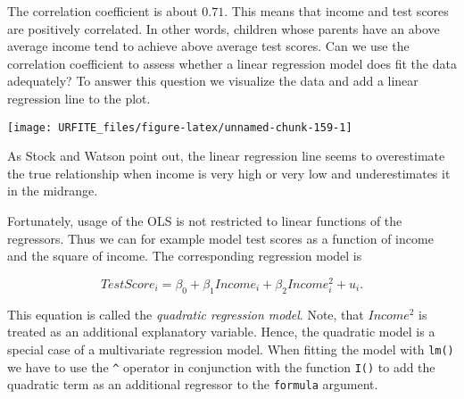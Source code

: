\documentclass[]{book}
\newenvironment{Shaded}{\begin{snugshade}}{\end{snugshade}}
\newcommand{\KeywordTok}[1]{\textcolor[rgb]{0.13,0.29,0.53}{\textbf{#1}}}
\newcommand{\DataTypeTok}[1]{\textcolor[rgb]{0.13,0.29,0.53}{#1}}
\newcommand{\DecValTok}[1]{\textcolor[rgb]{0.00,0.00,0.81}{#1}}
\newcommand{\StringTok}[1]{\textcolor[rgb]{0.31,0.60,0.02}{#1}}
\newcommand{\CommentTok}[1]{\textcolor[rgb]{0.56,0.35,0.01}{\textit{#1}}}
\newcommand{\OperatorTok}[1]{\textcolor[rgb]{0.81,0.36,0.00}{\textbf{#1}}}
\newcommand{\NormalTok}[1]{#1}
\theoremstyle{definition}
\theoremstyle{definition}
\theoremstyle{definition}
\theoremstyle{remark}
\begin{document}
The correlation coefficient is about \(0.71\). This means that income
and test scores are positively correlated. In other words, children
whose parents have an above average income tend to achieve above average
test scores. Can we use the correlation coefficient to assess whether a
linear regression model does fit the data adequately? To answer this
question we visualize the data and add a linear regression line to the
plot.

\begin{Shaded}
\end{Shaded}

\begin{center}\texttt{[image: URFITE\_files/figure-latex/unnamed-chunk-159-1]} \end{center}

As Stock and Watson point out, the linear regression line seems to
overestimate the true relationship when income is very high or very low
and underestimates it in the midrange.

Fortunately, usage of the OLS is not restricted to linear functions of
the regressors. Thus we can for example model test scores as a function
of income and the square of income. The corresponding regression model
is

\[TestScore_i = \beta_0 + \beta_1 Income_i + \beta_2 Income_i^2 + u_i.\]

This equation is called the \emph{quadratic regression model}. Note,
that \(Income^2\) is treated as an additional explanatory variable.
Hence, the quadratic model is a special case of a multivariate
regression model. When fitting the model with \texttt{lm()} we have to
use the \texttt{\^{}} operator in conjunction with the function
\texttt{I()} to add the quadratic term as an additional regressor to the
\texttt{formula} argument.
\end{document}
